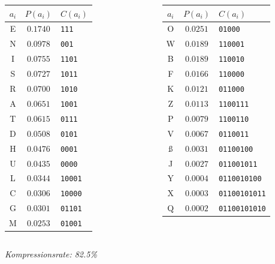 \documentclass[xcolor=dvipsnames,presentation]{beamer}    %
\begin{document}
\begin{frame}{\insertsubsection}
  \begin{columns}[T]
    \begin{tabular}{c|c|l}
      $a_i$ & $P(a_i)$ & $C(a_i)$ \\ \hline
      E & $0.1740$ & {\tt111} \\
      N & $0.0978$ & {\tt001} \\
      I & $0.0755$ & {\tt1101} \\
      S & $0.0727$ & {\tt1011} \\
      R & $0.0700$ & {\tt1010} \\
      A & $0.0651$ & {\tt1001} \\
      T & $0.0615$ & {\tt0111} \\
      D & $0.0508$ & {\tt0101} \\
      H & $0.0476$ & {\tt0001} \\
      U & $0.0435$ & {\tt0000} \\
      L & $0.0344$ & {\tt10001} \\
      C & $0.0306$ & {\tt10000} \\
      G & $0.0301$ & {\tt01101} \\
      M & $0.0253$ & {\tt01001} \\
    \end{tabular}

    \begin{tabular}{c|c|l}
      $a_i$ & $P(a_i)$ & $C(a_i)$ \\ \hline
      O & $0.0251$ & {\tt01000} \\
      W & $0.0189$ & {\tt110001} \\
      B & $0.0189$ & {\tt110010} \\
      F & $0.0166$ & {\tt110000} \\
      K & $0.0121$ & {\tt011000} \\
      Z & $0.0113$ & {\tt1100111} \\
      P & $0.0079$ & {\tt1100110} \\
      V & $0.0067$ & {\tt0110011} \\
      ß & $0.0031$ & {\tt01100100} \\
      J & $0.0027$ & {\tt011001011} \\
      Y & $0.0004$ & {\tt0110010100} \\
      X & $0.0003$ & {\tt01100101011} \\
      Q & $0.0002$ & {\tt01100101010}
    \end{tabular}
  \end{columns}
  \vspace{15pt}
  \emph{Kompressionsrate: 82.5\%}
\end{frame}
\end{document}
